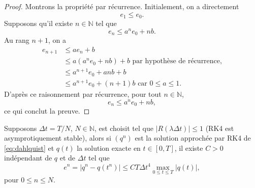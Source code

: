\begin{proof}
Montrons la propriété par récurrence. Initialement, on a directement
\begin{equation}
e_1 \leq e_0.
\end{equation}
Supposons qu'il existe $n \in \mathbb{N}$ tel que
\begin{equation}
e_n \leq a^n e_0 + nb.
\end{equation}
Au rang $n+1$, on a
\begin{align*}
e_{n+1} & \leq a e_n + b \\
	& \leq a \left( a^n e_0 + nb \right) + b \text{ par hypothèse de récurrence,}  \\
	& \leq a^{n+1} e_0 + anb + b\\
	& \leq a^{n+1} e_0 + (n+1)b \text{ car } 0 \leq a \leq 1.
\end{align*}
D'après ce raisonnement par récurrence, pour tout $n \in \mathbb{N}$,
\begin{equation}
e_n \leq a^n e_0 + nb,
\end{equation}
ce qui conclut la preuve.
\end{proof}

\begin{proposition}
Supposons $\Delta t = T/N$, $N \in \mathbb{N}$, est choisit tel que $|R(\lambda \Delta t ) | \leq 1$ (RK4 est asymprotiquement stable), alors si $(q^{n})$ est la solution approchée par RK4 de \eqref{eq:dahlquist} et $q(t)$ la solution exacte en $t \in [0,T]$, il existe $C>0$ indépendant de $q$ et de $\Delta t$ tel que
\begin{equation}
e^{n} = | q^{n} - q(t^{n}) | \leq C T \Delta t^4 \max_{0 \leq t \leq T} | q(t) |,
\end{equation}
pour $0 \leq n \leq N$.
\label{prop:consistance_rk4}
\end{proposition}

